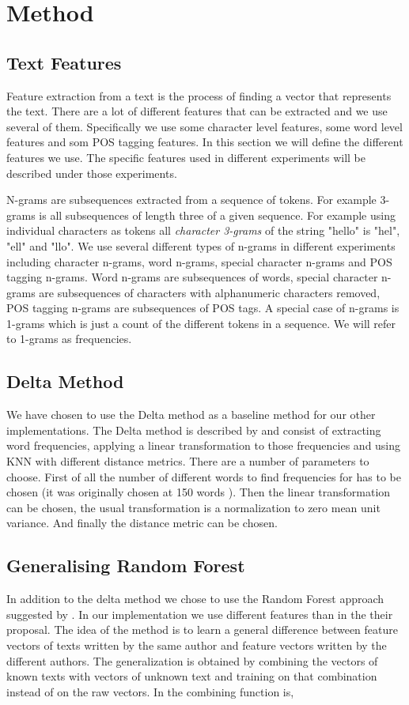 \section{Method}

\subsection{Text Features}
Feature extraction from a text is the process of finding a vector that
represents the text. There are a lot of different features that can be extracted
and we use several of them. Specifically we use some character level features,
some word level features and som \gls{POS} tagging features. In this section
we will define the different features we use. The specific features used in
different experiments will be described under those experiments.

N-grams are subsequences extracted from a sequence of tokens. For example
3-grams is all subsequences of length three of a given sequence. For example
using individual characters as tokens all \textit{character 3-grams} of the
string "hello" is "hel", "ell" and "llo". We use several different types of
n-grams in different experiments including character n-grams, word n-grams,
special character n-grams and \gls{POS} tagging n-grams. Word n-grams are
subsequences of words, special character n-grams are subsequences of characters
with alphanumeric characters removed, \gls{POS} tagging n-grams are subsequences
of \gls{POS} tags. A special case of n-grams is 1-grams which is just a count of
the different tokens in a sequence. We will refer to 1-grams as frequencies.

\subsection{Delta Method}
We have chosen to use the Delta method as a baseline method for our other
implementations. The Delta method is described by \cite{evert2015towards} and
consist of extracting word frequencies, applying a linear transformation to
those frequencies and using \gls{KNN} with different distance metrics. There are
a number of parameters to choose. First of all the number of different words to
find frequencies for has to be chosen (it was originally chosen at 150 words
\cite{evert2015towards}). Then the linear transformation can be chosen, the
usual transformation is a normalization to zero mean unit variance. And finally
the distance metric can be chosen.

\subsection{Generalising Random Forest}
In addition to the delta method we chose to use the Random Forest approach
suggested by \cite{pacheco2015}. In our implementation we use different
features than in the their proposal. The idea of the method is to learn a
general difference between feature vectors of texts written by the same author
and feature vectors written by the different authors. The generalization is
obtained by combining the vectors of known texts with vectors of unknown
text and training on that combination instead of on the raw vectors. In
\cite{pacheco2015} the combining function is,

